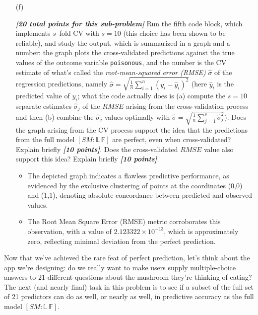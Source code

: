\documentclass[12pt]{article}
\newcommand{\bi}[1]{\b{\i{#1}}}
\renewcommand{\b}[1]{\textbf{#1}}
\renewcommand{\i}[1]{\textit{#1}}
\begin{document}
\begin{itemize}

\item[(f)]

\bi{[20 total points for this sub-problem]} Run the fifth code block, which implements $s$--fold CV with $s = 10$ (this choice has been shown to be reliable), and study the output, which is summarized in a graph and a number: the graph plots the cross-validated predictions against the true values of the outcome variable \texttt{poisonous}, and the number is the CV estimate of what's called the \textit{root-mean-squared error (RMSE)} $\hat{ \sigma }$ of the regression predictions, namely $\hat{ \sigma } = \sqrt{ \frac{ 1 }{ n } \sum_{ i = 1 }^n ( y_i - \hat{ y }_i )^2 }$ (here $\hat{ y }_i$ is the predicted value of $y_i$; what the code actually does is (a) compute the $s = 10$ separate estimates $\hat{ \sigma }_j$ of the $RMSE$ arising from the cross-validation process and then (b) combine the $\hat{ \sigma }_j$ values optimally with $\hat{ \sigma } = \sqrt{ \frac{ 1 }{ n } \sum_{ j = 1 }^s \hat{ \sigma }_j^2 }$). Does the graph arising from the CV process support the idea that the predictions from the full model $[ SM \! \! : \! \mathbb{ L } \, \mathbb{ F } ]$ are perfect, even when cross-validated? Explain briefly \bi{[10 points]}. Does the cross-validated $RMSE$ value also support this idea? Explain briefly \bi{[10 points]}. 

{\color{blue}
\begin{itemize}
\item The depicted graph indicates a flawless predictive performance, as evidenced by the exclusive clustering of points at the coordinates (0,0) and (1,1), denoting absolute concordance between predicted and observed values.

\item The Root Mean Square Error (RMSE) metric corroborates this observation, with a value of \( 2.123322 \times 10^{-13} \), which is approximately zero, reflecting minimal deviation from the perfect prediction.

\end{itemize} 


}
\end{itemize}

Now that we've achieved the rare feat of perfect prediction, let's think about the app we're designing: do we really want to make users supply multiple-choice answers to 21 different questions about the mushroom they're thinking of eating?
The next (and nearly final) task in this problem is to see if a subset of the full set of 21 predictors can do as well, or nearly as well, in predictive accuracy as the full model $[ SM \! \! : \! \mathbb{ L } \, \mathbb{ F } ]$.
\end{document}
